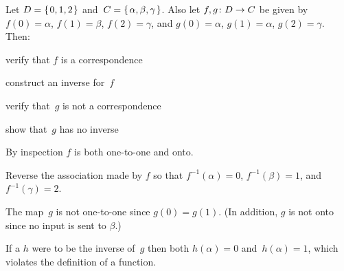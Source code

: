 \documentclass{ibl}  %
\begin{document}
\begin{problem}
Let $D=\mbox{$\{\hspace{0.1em}0,1,2\hspace{0.1em}\}$}$ and~$C=\mbox{$\{\hspace{0.1em}\alpha,\beta,\gamma\hspace{0.1em}\}$}$.
Also let $\mbox{$f,g\colon D\to C$}$ be given by
$f(0)=\alpha$, $f(1)=\beta$, $f(2)=\gamma$, and
$g(0)=\alpha$, $g(1)=\alpha$, $g(2)=\gamma$.
Then:
\begin{items}
\item verify that $f$ is a correspondence
\item construct an inverse for~$f$\!
\item verify that~$g$ is not a correspondence
\item show that~$g$ has no inverse 
\end{items}
\begin{answer}
\begin{items}
\item By inspection $f$ is both one-to-one and onto.
\item Reverse the association made by $f$ so that $f^{-1}(\alpha)=0$,
  $f^{-1}(\beta)=1$, and~$f^{-1}(\gamma)=2$.
\item The map~$g$ is not one-to-one since $g(0)=g(1)$.
  (In addition, $g$ is not onto since no input is sent to $\beta$.) 
\item If a $h$ were to be the inverse of~$g$
  then both $h(\alpha)=0$ and~$h(\alpha)=1$, 
  which violates the definition of a function.   
\end{items}
\end{answer}
\end{problem}
\end{document}

